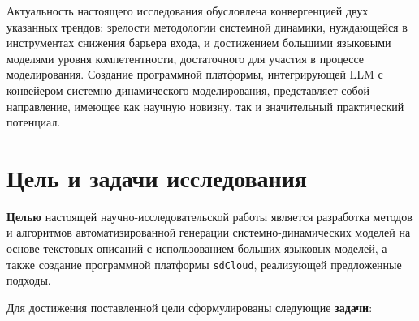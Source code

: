 Актуальность настоящего исследования обусловлена конвергенцией двух указанных трендов: зрелости методологии системной динамики, нуждающейся в инструментах снижения барьера входа, и достижением большими языковыми моделями уровня компетентности, достаточного для участия в процессе моделирования. Создание программной платформы, интегрирующей LLM с конвейером системно-динамического моделирования, представляет собой направление, имеющее как научную новизну, так и значительный практический потенциал.

\section*{Цель и задачи исследования}

\textbf{Целью} настоящей научно-исследовательской работы является разработка методов и алгоритмов автоматизированной генерации системно-динамических моделей на основе текстовых описаний с использованием больших языковых моделей, а также создание программной платформы \texttt{sdCloud}, реализующей предложенные подходы.

Для достижения поставленной цели сформулированы следующие \textbf{задачи}:

